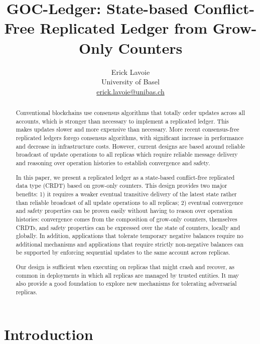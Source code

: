 \documentclass[9pt]{article}   	%
\title{GOC-Ledger: State-based Conflict-Free Replicated Ledger from Grow-Only Counters}
\author{Erick Lavoie \\
University of Basel \\
\href{mailto:erick.lavoie@unibas.ch}{erick.lavoie@unibas.ch}}
\begin{document}
\maketitle


\begin{abstract}
Conventional blockchains use consensus algorithms that totally order updates across all accounts, which is stronger than necessary to implement a replicated ledger. This makes updates slower and more expensive than necessary. More recent consensus-free replicated ledgers forego consensus algorithms, with significant increase in performance and decrease in infrastructure costs. However, current designs are based around reliable broadcast of update operations to all replicas which require reliable message delivery and reasoning over operation histories to establish convergence and safety.

In this paper, we present a replicated ledger as a state-based conflict-free replicated data type (CRDT) based on grow-only counters. This design provides two major benefits: 1) it requires a weaker eventual transitive delivery of the latest state rather than reliable broadcast of all update operations to all replicas; 2) eventual convergence and safety properties can be proven easily without having to reason over operation histories: convergence comes from the composition of grow-only counters, themselves CRDTs, and safety properties can be expressed over the state of counters, locally and globally. In addition, applications that tolerate temporary negative balances require no additional mechanisms and applications that require strictly non-negative balances can be supported by enforcing sequential updates to the same account across replicas.

Our design is sufficient when executing on replicas that might crash and recover, as common in deployments in which all replicas are managed by trusted entities. It may also provide a good foundation to explore new mechanisms for tolerating adversarial replicas.
\end{abstract}

\section{Introduction}
\label{sec:introduction}
\end{document}

